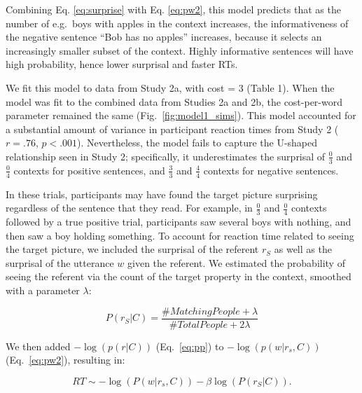 \documentclass[10pt,letterpaper]{article}
\begin{document}
\noindent Combining Eq. \ref{eq:surprise} with Eq. \ref{eq:pw2}, this model predicts that as the number of e.g.\ boys with apples in the context increases, the informativeness of the negative sentence ``Bob has no apples'' increases, because it selects an increasingly smaller subset of the context. Highly informative sentences will have high probability, hence lower surprisal and faster RTs. 

We fit this model to data from Study 2a, with cost = 3 (Table 1).  When the model was fit to the combined data from Studies 2a and 2b, the cost-per-word parameter remained the same (Fig.\ \ref{fig:model1_sims}).  This model accounted for a substantial amount of variance in participant reaction times from Study 2 ($r=.76$, $p<.001$).  Nevertheless, the model fails to capture the U-shaped relationship seen in Study 2; specifically, it underestimates the surprisal of $\frac{0}{3}$ and $\frac{0}{4}$ contexts for positive sentences, and $\frac{3}{3}$ and $\frac{4}{4}$ contexts for negative sentences.

In these trials, participants may have found the target picture surprising regardless of the sentence that they read. For example, in $\frac{0}{3}$ and $\frac{0}{4}$ contexts followed by a true positive trial, participants saw several boys with nothing, and then saw a boy holding something.  To account for reaction time related to seeing the target picture, we included the surprisal of the referent $r_S$ as well as the surprisal of the utterance $w$ given the referent. We estimated the probability of seeing the referent via the count of the target property in the context, smoothed with a parameter $\lambda$:

\begin{equation}\label{eq:pp}
P(r_S | C) =  \frac{\# Matching People  + \lambda}{\# Total People + 2\lambda}
\end{equation}

We then added $-\log(p(r|C))$ (Eq.\ \ref{eq:pp}) to $-\log(p(w|r_s,C))$ (Eq.\ \ref{eq:pw2}), resulting in:

\begin{equation}\label{eq:total}
RT \sim - \log(P(w|r_s, C)) - \beta \log(P(r_S|C)).
\end{equation}
\end{document}
